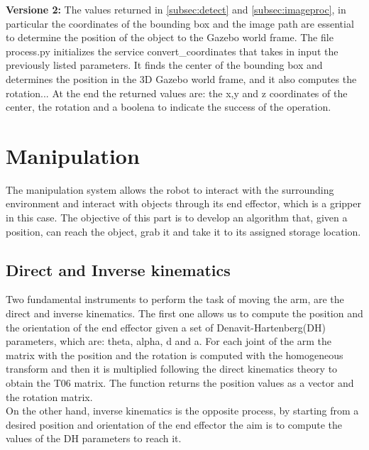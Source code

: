 \documentclass[12pt,a4paper]{article}
\begin{document}
\textbf{Versione 2:} The values returned in \ref{subsec:detect} and \ref{subsec:imageproc}, in particular the coordinates of the bounding box and the image path are essential to determine the position of the object to the Gazebo world frame. The file process.py initializes the service convert\_coordinates that takes in input the previously listed parameters. It finds the center of the bounding box and determines the position in the 3D Gazebo world frame, and it also computes the rotation... At the end the returned values are: the x,y and z coordinates of the center, the rotation and a boolena to indicate the success of the operation.


\section{Manipulation}\label{sec:manipulation}
The manipulation system allows the robot to interact with the surrounding environment and interact with objects through its end effector, which is a gripper in this case.
The objective of this part is to develop an algorithm that, given a position, can reach the object, grab it and take it to its assigned storage location.
\subsection{Direct and Inverse kinematics}\label{subsec:kinematics}
Two fundamental instruments to perform the task of moving the arm, are the direct and inverse kinematics. The first one allows us to compute the position and the orientation of the end effector given a set of Denavit-Hartenberg(DH) parameters, which are: theta, alpha, d and a. For each joint of the arm the matrix with the position and the rotation is computed with the homogeneous transform and then it is multiplied following the direct kinematics theory to obtain the T06 matrix. The function returns the position values as a vector and the rotation matrix.\\
On the other hand, inverse kinematics is the opposite process, by starting from a desired position and orientation of the end effector the aim is to compute the values of the DH parameters to reach it.
\end{document}
